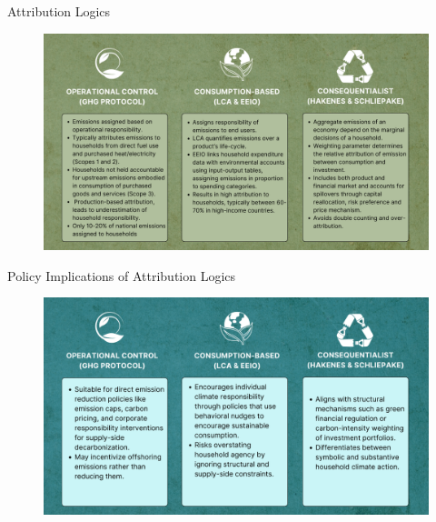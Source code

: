 \documentclass{beamer}
\begin{document}
\begin{frame}{Attribution Logics}
  \vspace{-2.5em}
\begin{figure}
\includegraphics[width=\linewidth]{Operational Control.png}
\end{figure}
\end{frame}

\begin{frame}{Policy Implications of Attribution Logics}
  \vspace{-2.5em}
\begin{figure}
\includegraphics[width=\linewidth]{Policy Implications.png}
\end{figure}
\end{frame}
\end{document}
